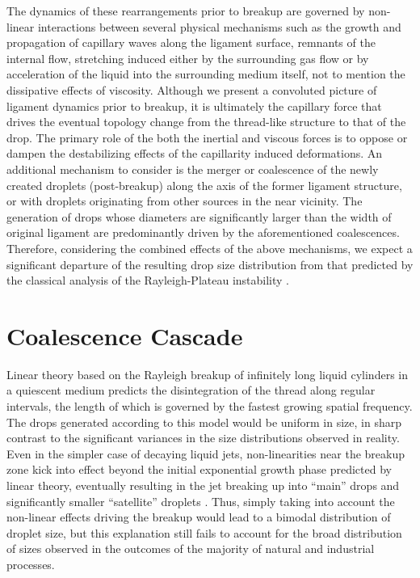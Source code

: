 The dynamics of these rearrangements prior to breakup are 
governed by non-linear interactions between several 
physical mechanisms such as the growth and propagation of capillary 
waves along the ligament surface, remnants of the internal flow, 
stretching induced either by the surrounding gas flow or by 
acceleration of the liquid into the surrounding medium itself,
not to mention the dissipative effects of viscosity.  
Although we present a convoluted picture of ligament dynamics prior
to breakup, it is ultimately the capillary force that drives the 
eventual topology change from the thread-like structure to that of the drop. 
The primary role of the both the inertial and viscous forces is to oppose 
or dampen the destabilizing effects of the capillarity induced deformations.   
An additional mechanism to consider is the merger or coalescence of the 
newly created droplets (post-breakup) along the axis of the former ligament
structure, or with droplets originating from other sources in the near vicinity. 
The generation of drops whose diameters are significantly larger than the 
width of original ligament are predominantly driven by the aforementioned coalescences.  
Therefore, considering the combined effects of the above mechanisms, we expect a significant
departure of the resulting drop size distribution from that predicted by the  
classical analysis of the Rayleigh-Plateau instability \cite{rayleigh1879a,rayleigh1879b}. 


\section{Coalescence Cascade}

Linear theory based on the Rayleigh breakup of infinitely
long liquid cylinders in a quiescent medium predicts the disintegration
of the thread along regular intervals, the length of which is governed
by the fastest growing spatial frequency. 
The drops generated according to this model would be uniform in
size, in sharp contrast to the significant variances in the size distributions
observed in reality.  
Even in the simpler case of decaying liquid jets, 
non-linearities near the breakup zone kick into effect beyond
the initial exponential growth phase predicted by linear theory, 
eventually resulting in the jet breaking up into 
``main'' drops and significantly smaller ``satellite'' droplets 
. 
Thus, simply taking into account the non-linear effects driving the breakup would
lead to a bimodal distribution of droplet size, but this explanation 
still fails to account for the broad distribution of sizes observed in 
the outcomes of the majority of natural \cite{nature} and industrial \cite{industrial} processes. 


